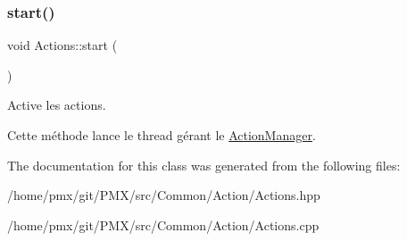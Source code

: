 \subsubsection{\texorpdfstring{start()}{start()}}
{\footnotesize\ttfamily void Actions\+::start (\begin{DoxyParamCaption}{ }\end{DoxyParamCaption})}



Active les actions. 

Cette méthode lance le thread gérant le \hyperlink{classActionManager}{Action\+Manager}. 

The documentation for this class was generated from the following files\+:\begin{DoxyCompactItemize}
\item 
/home/pmx/git/\+P\+M\+X/src/\+Common/\+Action/Actions.\+hpp\item 
/home/pmx/git/\+P\+M\+X/src/\+Common/\+Action/Actions.\+cpp\end{DoxyCompactItemize}
